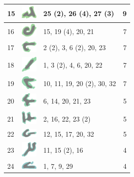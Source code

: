 \documentclass[final]{report}
\begin{document}
\begin{center}
\begin{longtable}{|p{0.5cm}|p{1.2cm}|p{11.89cm}|r|}
\hline
15 & \includegraphics[align=t,width=0.8cm]{0015} & 25 (2), 26 (4), 27 (3) & 9 \\
\hline
16 & \includegraphics[align=t,width=0.8cm]{0016} & 15, 19 (4), 20, 21 & 7 \\
\hline
17 & \includegraphics[align=t,width=0.8cm]{0017} & 2 (2), 3, 6 (2), 20, 23 & 7 \\
\hline
18 & \includegraphics[align=t,width=0.8cm]{0018} & 1, 3 (2), 4, 6, 20, 22 & 7 \\
\hline
19 & \includegraphics[align=t,width=0.8cm]{0019} & 10, 11, 19, 20 (2), 30, 32 & 7 \\
\hline
20 & \includegraphics[align=t,width=0.8cm]{0020} & 6, 14, 20, 21, 23 & 5 \\
\hline
21 & \includegraphics[align=t,width=0.8cm]{0021} & 2, 16, 22, 23 (2) & 5 \\
\hline
22 & \includegraphics[align=t,width=0.8cm]{0022} & 12, 15, 17, 20, 32 & 5 \\
\hline
23 & \includegraphics[align=t,width=0.8cm]{0023} & 11, 15 (2), 16 & 4 \\
\hline
24 & \includegraphics[align=t,width=0.8cm]{0024} & 1, 7, 9, 29 & 4 \\

\end{longtable}
\end{center}
\end{document}
